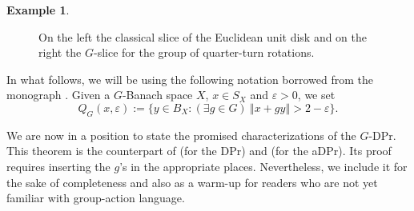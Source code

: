 \documentclass[a4paper,12pt]{amsart}
\theoremstyle{definition}
\theoremstyle{definition}
\newtheorem{example}[theorem]{Example}
\theoremstyle{remark}
\numberwithin{equation}{section}
\newcommand{\<}{\langle}
\renewcommand{\>}{\rangle}
\newcommand{\norm}[1]{\left\Vert#1\right\Vert}
\newcommand{\e}{\varepsilon}
\newcommand{\eps}{\e}
\begin{document}
\begin{example}
\begin{figure}[ht]
			\caption{On the left the classical slice of the Euclidean unit disk and on the right the $G$-slice for the group of quarter-turn rotations.}
			\label{fig:G-slice-R2}
		\end{figure}
		
	\end{example}
	
	In what follows, we will be using the following notation borrowed from the monograph \cite{Kadets2000}. Given a $G$-Banach space $X$, $x \in S_X$ and $\eps>0$, we set
	\begin{equation*}
		Q_G(x,\e):= \{y \in B_X: (\exists g \in G) \ \norm{x + gy} > 2 - \e\}.
	\end{equation*}
	
	
	We are now in a position to state the promised characterizations of the \(G\)-DPr. This theorem is the counterpart of \cite[Theorem 3.1.11]{KMRW} (for the DPr) and \cite[Proposition 2.1]{MO2004} (for the aDPr). Its proof requires inserting the $g$'s in the appropriate places. Nevertheless, we include it for the sake of completeness and also as a warm-up for readers who are not yet familiar with group-action language.
	
\end{document}

